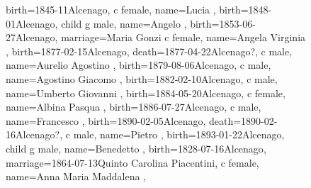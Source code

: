 \documentclass{article}
\begin{document}
\begin{figure}
\begin{genealogypicture}
{{{{{                        birth={1845-11}{Alcenago},
                    }
                    c{
                        female,
                        name={Lucia },
                        birth={1848-01}{Alcenago},
                    }
                    child{
                        g{
                            male,
                            name={Angelo },
                            birth={1853-06-27}{Alcenago},
                            marriage={Maria Gonzi}{}
                        }
                        c{
                            female,
                            name={Angela Virginia },
                            birth={1877-02-15}{Alcenago},
                            death={1877-04-22}{Alcenago?},
                        }
                        c{
                            male,
                            name={Aurelio Agostino },
                            birth={1879-08-06}{Alcenago},
                        }
                        c{
                            male,
                            name={Agostino Giacomo },
                            birth={1882-02-10}{Alcenago},
                        }
                        c{
                            male,
                            name={Umberto Giovanni },
                            birth={1884-05-20}{Alcenago},
                        }
                        c{
                            female,
                            name={Albina Pasqua },
                            birth={1886-07-27}{Alcenago},
                        }
                        c{
                            male,
                            name={Francesco },
                            birth={1890-02-05}{Alcenago},
                            death={1890-02-16}{Alcenago?},
                        }
                        c{
                            male,
                            name={Pietro },
                            birth={1893-01-22}{Alcenago},
                        }
                    }
                }
                child{
                    g{
                        male,
                        name={Benedetto },
                        birth={1828-07-16}{Alcenago},
                        marriage={1864-07-13}{Quinto \newline Carolina Piacentini},
                    }
                    c{
                        female,
                        name={Anna Maria Maddalena },
}}}}}
\end{genealogypicture}
\end{figure}
\end{document}
